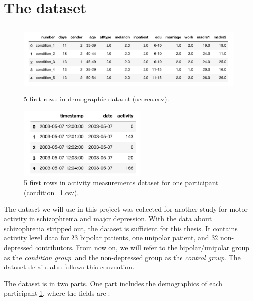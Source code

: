 \section{The dataset}

\begin{figure}
    \begin{center}
        \includegraphics[height=3.5cm]{img/demographics.png}
        \caption{5 first rows in demographic dataset (scores.csv).}
        \label{figure:demographics}
    \end{center}
\end{figure}

\begin{figure}
    \begin{center}
        \includegraphics[height=3.5cm]{img/participant.png}
        \caption{5 first rows in activity measurements dataset for one participant (condition\_1.csv).}
        \label{figure:participant_activity}
    \end{center}
\end{figure}

The dataset we will use in this project \cite{dataset} was collected for another study for motor activity in schizophrenia and major depression. With the data about schizophrenia stripped out, the dataset is sufficient for this thesis. It contains activity level data for 23 bipolar patients, one unipolar patient, and 32 non-depressed contributors. From now on, we will refer to the bipolar/unipolar group as the \textit{condition group}, and the non-depressed group as the \textit{control group}. The dataset details \cite{dataset_details} also follows this convention.

The dataset is in two parts. One part includes the demographics of each participant \ref{figure:demographics}, where the fields are \cite{dataset_details}:

